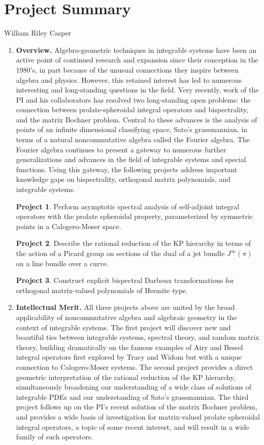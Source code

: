 \documentclass[11pt,letterpaper]{article}
\newcommand{\required}[1]{\section*{\hfil #1\hfil}}                    %
\theoremstyle{definition}
\newtheorem{goal}{Project}
\begin{document}
\required{Project Summary}
\begin{center}
William Riley Casper
\end{center}

\begin{enumerate}[(1)]
\item{\textbf{Overview.}}
Algebro-geometric techniques in integrable systems have been an active point of continued research and expansion since their conception in the 1980's, in part because of the unusual connections they inspire between algebra and physics.
However, this retained interest has led to numerous interesting and long-standing questions in the field.  Very recently, work of the PI and his collaborators has resolved two long-standing open problems: the connection between prolate-spheroidal integral operators and bispectrality, and the matrix Bochner problem.  Central to these advances is the analysis of points of an infinite dimensional classifying space, Sato's grassmannian, in terms of a natural noncommutative algebra called the Fourier algebra.
The Fourier algebra continues to present a gateway to numerous further generalizations and advances in the field of integrable systems and special functions.  Using this gateway, the following projects address important knowledge gaps on bispectrality, orthogonal matrix polynomials, and integrable systems.
\begin{goal}\label{goal1}
Perform asymptotic spectral analysis of self-adjoint integral operators with the prolate spheroidal property, parameterized by symmetric points in a Calogero-Moser space.
\end{goal}
\begin{goal}\label{goal2}
Describe the rational reduction of the KP hierarchy in terms of the action of a Picard group on sections of the dual of a jet bundle $J^\infty(\pi)$ on a line bundle over a curve.
\end{goal}
\begin{goal}\label{goal3}
Construct explicit bispectral Darboux transformations for orthogonal matrix-valued polynomials of Hermite type.
\end{goal}
\item{\textbf{Intellectual Merit.}}
All three projects above are united by the broad applicability of noncommutative algebra and algebraic geometry in the context of integrable systems.
The first project will discover new and beautiful ties between integrable systems, spectral theory, and random matrix theory, building dramatically on the famous examples of Airy and Bessel integral operators first explored by Tracy and Widom but with a unique connection to Calogero-Moser systems.
The second project provides a direct geometric interpretation of the rational reduction of the KP hierarchy, simultaneously broadening our understanding of a wide class of solutions of integrable PDEs and our understanding of Sato's grassmannian.
The third project follows up on the PI's recent solution of the matrix Bochner problem, and provides a wide basis of investigation for matrix-valued prolate spheroidal integral operators, a topic of some recent interest, and will result in a wide family of such operators.


\end{enumerate}
\end{document}

